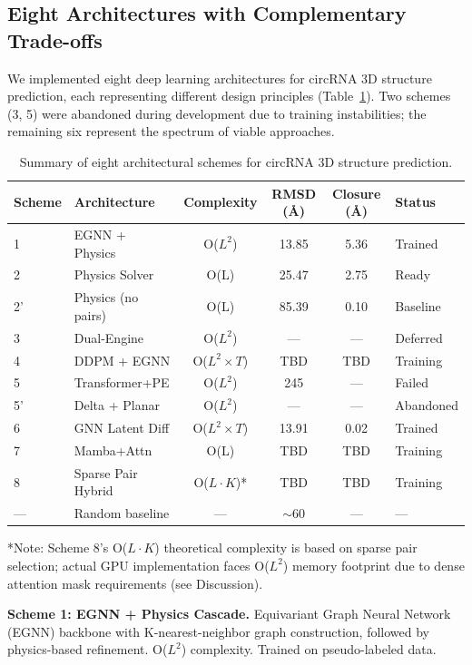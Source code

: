 \subsection{Eight Architectures with Complementary Trade-offs}

We implemented eight deep learning architectures for circRNA 3D structure prediction, each representing different design principles (Table~\ref{tab:schemes}). Two schemes (3, 5) were abandoned during development due to training instabilities; the remaining six represent the spectrum of viable approaches.

\begin{table}[htbp]
\centering
\caption{Summary of eight architectural schemes for circRNA 3D structure prediction.}
\label{tab:schemes}
\begin{tabular}{llcccl}
\toprule
Scheme & Architecture & Complexity & RMSD (\AA) & Closure (\AA) & Status \\
\midrule
1 & EGNN + Physics & O($L^2$) & 13.85 & 5.36 & Trained \\
2 & Physics Solver & O(L) & 25.47 & 2.75 & Ready \\
2' & Physics (no pairs) & O(L) & 85.39 & 0.10 & Baseline \\
3 & Dual-Engine & O($L^2$) & --- & --- & Deferred \\
4 & DDPM + EGNN & O($L^2 \times T$) & TBD & TBD & Training \\
5 & Transformer+PE & O($L^2$) & 245 & --- & Failed \\
5' & Delta + Planar & O($L^2$) & --- & --- & Abandoned \\
6 & GNN Latent Diff & O($L^2 \times T$) & 13.91 & 0.02 & Trained \\
7 & Mamba+Attn & O(L) & TBD & TBD & Training \\
8 & Sparse Pair Hybrid & O($L \cdot K$)* & TBD & TBD & Training \\
\midrule
--- & Random baseline & --- & $\sim$60 & --- & --- \\
\bottomrule
\end{tabular}
\footnotesize
*Note: Scheme 8's O($L \cdot K$) theoretical complexity is based on sparse pair selection; actual GPU implementation faces O($L^2$) memory footprint due to dense attention mask requirements (see Discussion).
\end{table}

\textbf{Scheme 1: EGNN + Physics Cascade.} Equivariant Graph Neural Network (EGNN) \citep{satorras2021} backbone with K-nearest-neighbor graph construction, followed by physics-based refinement. O($L^2$) complexity. Trained on pseudo-labeled data.

